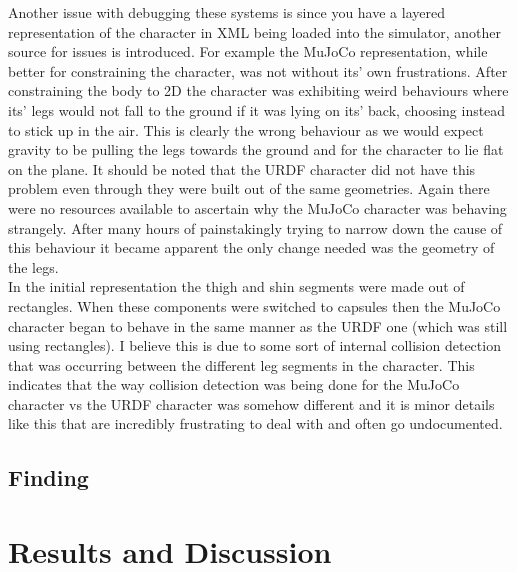 \documentclass[12pt, a4paper]{article}
\begin{document}
Another issue with debugging these systems is since you have a layered representation of the character in XML being loaded into the simulator, another source for issues is introduced. For example the MuJoCo representation, while better for constraining the character, was not without its' own frustrations. After constraining the body to 2D the character was exhibiting weird behaviours where its' legs would not fall to the ground if it was lying on its' back, choosing instead to stick up in the air.  This is clearly the wrong behaviour as we would expect gravity to be pulling the legs towards the ground and for the character to lie flat on the plane. It should be noted that the URDF character did not have this problem even through they were built out of the same geometries. Again there were no resources available to ascertain why the MuJoCo character was behaving strangely. After many hours of painstakingly trying to narrow down the cause of this behaviour it became apparent the only change needed was the geometry of the legs.\\
 
In the initial representation the thigh and shin segments were made out of rectangles. When these components were switched to capsules then the MuJoCo character began to behave in the same manner as the URDF one (which was still using rectangles). I believe this is due to some sort of internal collision detection that was occurring between the different leg segments in the character. This indicates that the way collision detection was being done for the MuJoCo character vs the URDF character was somehow different and it is minor details like this that are incredibly frustrating to deal with and often go undocumented.  

\subsection{Finding }

\newpage
\section{Results and Discussion}
\end{document}
